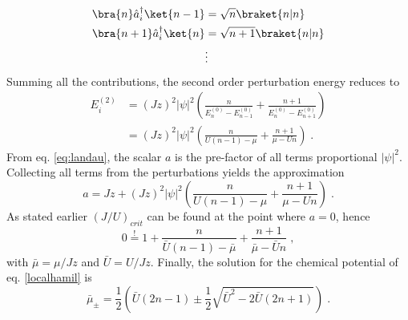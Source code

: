 \begin{align*}
	\bra{n}  \hat{a}_{i}^{\dag} \ket{n-1} &= \sqrt{n} \braket{n|n} \\
	\bra{n+1}  \hat{a}_{i}^{\dag} \ket{n} &= \sqrt{n+1} \braket{n|n} \\
	& \vdots
\end{align*}
Summing all the contributions, the second order perturbation energy reduces to
\begin{align}
	E_{i}^{(2)} &= \left( J z \right)^2 |\psi|^2 \left( \frac{n}{E_{n}^{(0)}- E_{n-1}^{(0)}} +  \frac{n+1}{E_{n}^{(0)}- E_{n+1}^{(0)}} \right) \nonumber \\
	&= \left( J z \right)^2 |\psi|^2 \left( \frac{n}{U(n-1) - \mu} + \frac{n+1}{\mu - U n} \right) \; .
\end{align}
From eq. \eqref{eq:landau}, the scalar $a$ is the pre-factor of all terms proportional $|\psi|^2$. Collecting all terms from the perturbations yields the approximation 
\begin{equation}
	a = J z + \left( J z \right)^2 |\psi|^2 \left( \frac{n}{U(n-1) - \mu} + \frac{n+1}{\mu - U n} \right) \; .
\end{equation} 
As stated earlier $(J/U)_{crit}$ can be found at the point where $a = 0$, hence
\begin{equation}
	0 \overset{!}{=} 1 + \frac{n}{\bar{U} (n-1) - \bar{\mu}} + \frac{n+1}{\bar{\mu} - \bar{U} n} \; ,
\end{equation}
with $\bar{\mu} = {\mu}/{J z}$ and $\bar{U} = {U}/{J z}$. Finally, the solution for the chemical potential of eq. \eqref{localhamil} is \cite{vanoosten}
\begin{equation}
	\bar{\mu}_{\pm} = \frac{1}{2} \left( \bar{U}(2n -1) \pm \frac{1}{2} \sqrt{\bar{U}^2 - 2 \bar{U} (2 n +1)} \right) \; .
\end{equation}
 
